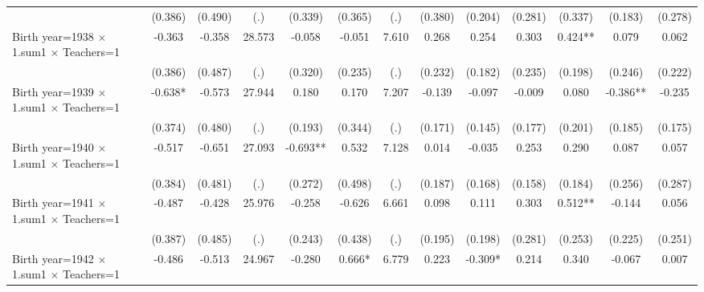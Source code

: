 {\begin{tabular}{l*{12}{c}}
                    &     (0.386)   &     (0.490)   &         (.)   &     (0.339)   &     (0.365)   &         (.)   &     (0.380)   &     (0.204)   &     (0.281)   &     (0.337)   &     (0.183)   &     (0.278)   \\
Birth year=1938 $\times$ 1.sum1 $\times$ Teachers=1&      -0.363   &      -0.358   &      28.573   &      -0.058   &      -0.051   &       7.610   &       0.268   &       0.254   &       0.303   &       0.424** &       0.079   &       0.062   \\
                    &     (0.386)   &     (0.487)   &         (.)   &     (0.320)   &     (0.235)   &         (.)   &     (0.232)   &     (0.182)   &     (0.235)   &     (0.198)   &     (0.246)   &     (0.222)   \\
Birth year=1939 $\times$ 1.sum1 $\times$ Teachers=1&      -0.638*  &      -0.573   &      27.944   &       0.180   &       0.170   &       7.207   &      -0.139   &      -0.097   &      -0.009   &       0.080   &      -0.386** &      -0.235   \\
                    &     (0.374)   &     (0.480)   &         (.)   &     (0.193)   &     (0.344)   &         (.)   &     (0.171)   &     (0.145)   &     (0.177)   &     (0.201)   &     (0.185)   &     (0.175)   \\
Birth year=1940 $\times$ 1.sum1 $\times$ Teachers=1&      -0.517   &      -0.651   &      27.093   &      -0.693** &       0.532   &       7.128   &       0.014   &      -0.035   &       0.253   &       0.290   &       0.087   &       0.057   \\
                    &     (0.384)   &     (0.481)   &         (.)   &     (0.272)   &     (0.498)   &         (.)   &     (0.187)   &     (0.168)   &     (0.158)   &     (0.184)   &     (0.256)   &     (0.287)   \\
Birth year=1941 $\times$ 1.sum1 $\times$ Teachers=1&      -0.487   &      -0.428   &      25.976   &      -0.258   &      -0.626   &       6.661   &       0.098   &       0.111   &       0.303   &       0.512** &      -0.144   &       0.056   \\
                    &     (0.387)   &     (0.485)   &         (.)   &     (0.243)   &     (0.438)   &         (.)   &     (0.195)   &     (0.198)   &     (0.281)   &     (0.253)   &     (0.225)   &     (0.251)   \\
Birth year=1942 $\times$ 1.sum1 $\times$ Teachers=1&      -0.486   &      -0.513   &      24.967   &      -0.280   &       0.666*  &       6.779   &       0.223   &      -0.309*  &       0.214   &       0.340   &      -0.067   &       0.007   \\

\end{tabular}}
